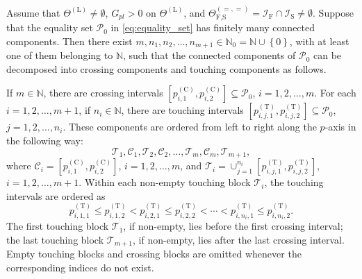 \documentclass[a4paper,12pt]{article}
\begin{document}
\begin{lemma}\label{cross_touch_lemma}
Assume that $\Theta^{\left(\text{L}\right)}\neq\emptyset$, $G_{pl}>0$ on $\Theta^{\left(\text{L}\right)}$, and $\Theta_{\text{F,S}}^{\left(=,=\right)}=\mathcal{I}_{\text{F}}\cap\mathcal{I}_{\text{S}}\neq\emptyset$. Suppose that the equality set $\mathcal{P}_0$ in \eqref{eq:equality_set} has finitely many connected components. Then there exist $m,n_1,n_2,\dots,n_{m+1}\in\mathbb{N}_0=\mathbb{N}\cup\left\{0\right\}$, with at least one of them belonging to $\mathbb{N}$, such that the connected components of $\mathcal{P}_0$ can be decomposed into crossing components and touching components as follows.

If $m\in\mathbb{N}$, there are crossing intervals $\left[p^{\left(\text{C}\right)}_{i,1},p^{\left(\text{C}\right)}_{i,2}\right]\subseteq\mathcal{P}_0$, $i=1,2,\dots,m$. For each $i=1,2,\dots,m+1$, if $n_i\in\mathbb{N}$, there are touching intervals $\left[p^{\left(\text{T}\right)}_{i,j,1},p^{\left(\text{T}\right)}_{i,j,2}\right]\subseteq\mathcal{P}_0$, $j=1,2,\dots,n_i$. These components are ordered from left to right along the $p$-axis in the following way:
\begin{equation*}
\mathcal{T}_1,\mathcal{C}_1,\mathcal{T}_2,\mathcal{C}_2,\dots,\mathcal{T}_m,\mathcal{C}_m,\mathcal{T}_{m+1},
\end{equation*}
where $\mathcal{C}_i=\left[p^{\left(\text{C}\right)}_{i,1},p^{\left(\text{C}\right)}_{i,2}\right]$, $i=1,2,\dots,m$, and $\mathcal{T}_i=\cup_{j=1}^{n_i}\left[p^{\left(\text{T}\right)}_{i,j,1},p^{\left(\text{T}\right)}_{i,j,2}\right]$, $i=1,2,\dots,m+1$. Within each non-empty touching block $\mathcal{T}_i$, the touching intervals are ordered as 
\begin{equation*}
p^{\left(\text{T}\right)}_{i,1,1}\leq p^{\left(\text{T}\right)}_{i,1,2}<p^{\left(\text{T}\right)}_{i,2,1}\leq p^{\left(\text{T}\right)}_{i,2,2}<\cdots<p^{\left(\text{T}\right)}_{i,n_i,1}\leq p^{\left(\text{T}\right)}_{i,n_i,2}.
\end{equation*}
The first touching block $\mathcal{T}_1$, if non-empty, lies before the first crossing interval; the last touching block $\mathcal{T}_{m+1}$, if non-empty, lies after the last crossing interval. Empty touching blocks and crossing blocks are omitted whenever the corresponding indices do not exist.


\end{lemma}
\end{document}
